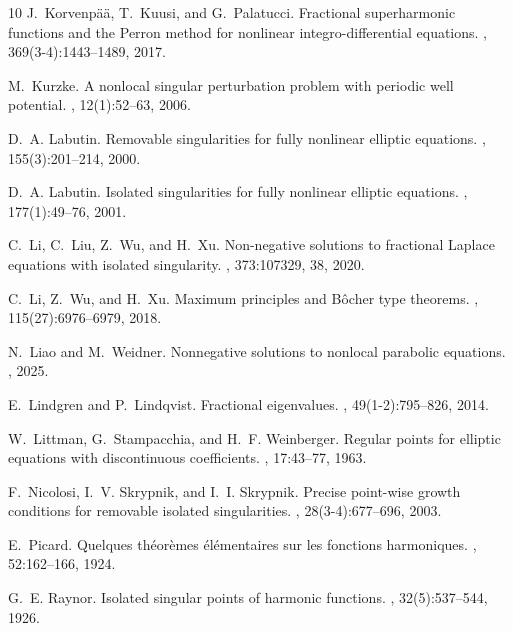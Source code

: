 \documentclass[11pt]{amsart}
\theoremstyle{plain}
\theoremstyle{definition}
\numberwithin{equation}{section}
\begin{document}
\begin{thebibliography}{10}
J.~Korvenp\"{a}\"{a}, T.~Kuusi, and G.~Palatucci.
\newblock Fractional superharmonic functions and the {P}erron method for
  nonlinear integro-differential equations.
, 369(3-4):1443--1489, 2017.

M.~Kurzke.
\newblock A nonlocal singular perturbation problem with periodic well
  potential.
, 12(1):52--63, 2006.

D.~A. Labutin.
\newblock Removable singularities for fully nonlinear elliptic equations.
, 155(3):201--214, 2000.

D.~A. Labutin.
\newblock Isolated singularities for fully nonlinear elliptic equations.
, 177(1):49--76, 2001.

C.~Li, C.~Liu, Z.~Wu, and H.~Xu.
\newblock Non-negative solutions to fractional {L}aplace equations with
  isolated singularity.
, 373:107329, 38, 2020.

C.~Li, Z.~Wu, and H.~Xu.
\newblock Maximum principles and {B}\^ocher type theorems.
, 115(27):6976--6979, 2018.

N.~Liao and M.~Weidner.
\newblock Nonnegative solutions to nonlocal parabolic equations.
, 2025.

E.~Lindgren and P.~Lindqvist.
\newblock Fractional eigenvalues.
, 49(1-2):795--826,
  2014.

W.~Littman, G.~Stampacchia, and H.~F. Weinberger.
\newblock Regular points for elliptic equations with discontinuous
  coefficients.
, 17:43--77, 1963.

F.~Nicolosi, I.~V. Skrypnik, and I.~I. Skrypnik.
\newblock Precise point-wise growth conditions for removable isolated
  singularities.
, 28(3-4):677--696, 2003.

E.~Picard.
\newblock Quelques th\'eor\`emes \'el\'ementaires sur les fonctions
  harmoniques.
, 52:162--166, 1924.

G.~E. Raynor.
\newblock Isolated singular points of harmonic functions.
, 32(5):537--544, 1926.


\end{thebibliography}
\end{document}
